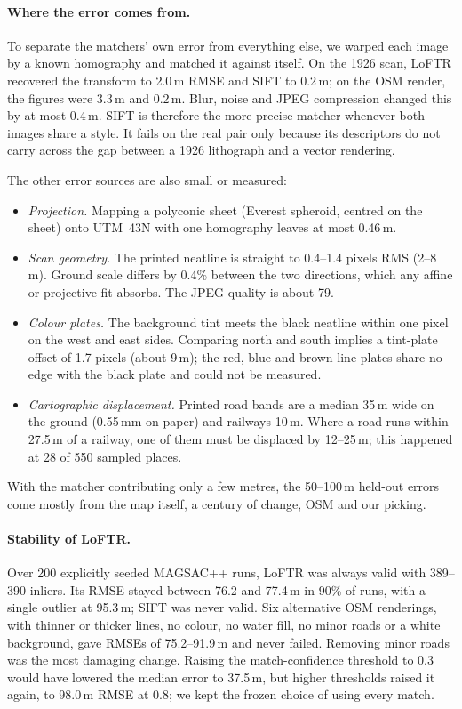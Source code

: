 \documentclass[10pt,twocolumn]{article}
\newcommand{\metre}{\,m}
\begin{document}
\paragraph{Where the error comes from.}
To separate the matchers' own error from everything else, we warped each image by a known homography and matched it against itself. On the 1926 scan, LoFTR recovered the transform to 2.0\metre{} RMSE and SIFT to 0.2\metre; on the OSM render, the figures were 3.3\metre{} and 0.2\metre. Blur, noise and JPEG compression changed this by at most 0.4\metre. SIFT is therefore the more precise matcher whenever both images share a style. It fails on the real pair only because its descriptors do not carry across the gap between a 1926 lithograph and a vector rendering.

The other error sources are also small or measured:
\begin{itemize}
\item \emph{Projection.} Mapping a polyconic sheet (Everest spheroid, centred on the sheet) onto UTM~43N with one homography leaves at most 0.46\metre.
\item \emph{Scan geometry.} The printed neatline is straight to 0.4--1.4 pixels RMS (2--8\metre). Ground scale differs by 0.4\% between the two directions, which any affine or projective fit absorbs. The JPEG quality is about 79.
\item \emph{Colour plates.} The background tint meets the black neatline within one pixel on the west and east sides. Comparing north and south implies a tint-plate offset of 1.7 pixels (about 9\metre); the red, blue and brown line plates share no edge with the black plate and could not be measured.
\item \emph{Cartographic displacement.} Printed road bands are a median 35\metre{} wide on the ground (0.55\,mm on paper) and railways 10\metre. Where a road runs within 27.5\metre{} of a railway, one of them must be displaced by 12--25\metre; this happened at 28 of 550 sampled places.
\end{itemize}
With the matcher contributing only a few metres, the 50--100\metre{} held-out errors come mostly from the map itself, a century of change, OSM and our picking.

\paragraph{Stability of LoFTR.}
Over 200 explicitly seeded MAGSAC++ runs, LoFTR was always valid with 389--390 inliers. Its RMSE stayed between 76.2 and 77.4\metre{} in 90\% of runs, with a single outlier at 95.3\metre; SIFT was never valid. Six alternative OSM renderings, with thinner or thicker lines, no colour, no water fill, no minor roads or a white background, gave RMSEs of 75.2--91.9\metre{} and never failed. Removing minor roads was the most damaging change. Raising the match-confidence threshold to 0.3 would have lowered the median error to 37.5\metre, but higher thresholds raised it again, to 98.0\metre{} RMSE at 0.8; we kept the frozen choice of using every match.
\end{document}
